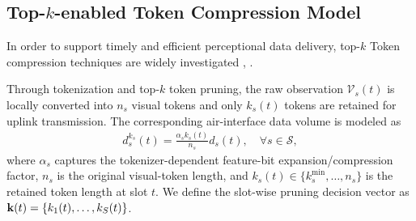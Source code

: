 \documentclass[lettersize,journal]{IEEEtran}
\theoremstyle{custom}
\begin{document}

\subsection{Top-$k$-enabled Token Compression Model}
In order to support timely and efficient perceptional data delivery, top-$k$ Token compression techniques are widely investigated \cite{}, \cite{}. 

Through tokenization and top-$k$ token pruning, the raw observation $\mathcal{V}_s(t)$ is locally converted into $n_s$ visual tokens and only $k_s(t)$ tokens are retained for uplink transmission. The corresponding air-interface data volume is modeled as
\begin{align}
    d_s^{k_s}(t) = \frac{\alpha_s k_s(t)}{n_s} d_s(t), \quad \forall s \in \mathcal{S},
    \label{token_volume}
\end{align}
where $\alpha_s$ captures the tokenizer-dependent feature-bit expansion/compression factor, $n_s$ is the original visual-token length, and $k_s(t)\in\{k_s^{\min},\ldots,n_s\}$ is the retained token length at slot $t$. We define the slot-wise pruning decision vector as ${\bf k}(t)=\{k_1(t),\ldots,k_S(t)\}$.
\end{document}
